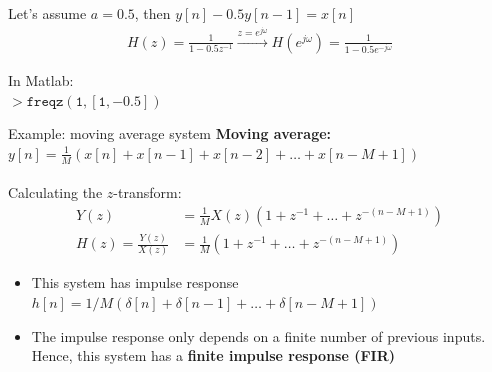 \documentclass[10pt]{beamer}
\begin{document}
\begin{frame}
\vspace{0.5cm}
Let's assume $a =0.5$, then $y[n] - 0.5y[n-1] = x[n]$
\begin{align*}
	H(z) = \frac{1}{1 - 0.5z^{-1}} \xrightarrow{z = e^{j\omega}} H(e^{j\omega}) = \frac{1}{1 - 0.5e^{-j\omega}} 
\end{align*}

In Matlab:\\
$> \mathtt{freqz(1, [1, -0.5])}$

\begin{center}
\end{center}

\end{frame}


\begin{frame}{Example: moving average system}
\textbf{Moving average:} $y[n] = \frac{1}{M}(x[n] + x[n-1] + x[n-2] + \ldots+ x[n-M+1])$
~\\
~\\

Calculating the $z$-transform:
\begin{align*}
Y(z) &= \frac{1}{M}X(z)(1 + z^{-1} + \ldots+ z^{-(n-M+1)}) \\
H(z) = \frac{Y(z)}{X(z)} &= \frac{1}{M}(1 + z^{-1} + \ldots+ z^{-(n-M+1)})
\end{align*}	

\begin{itemize}
	\pause\item This system has impulse response $h[n] = 1/M(\delta[n] + \delta[n-1] + \ldots + \delta[n-M+1])$
	\pause\item The impulse response only depends on a finite number of previous inputs. Hence, this system has a \textbf{finite impulse response (FIR)}
\end{itemize}	
\end{frame}
\end{document}
